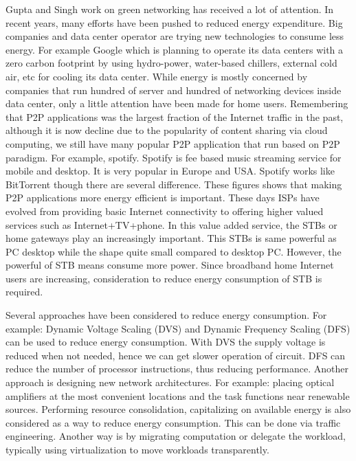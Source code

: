 Gupta and Singh \cite{Gupta:2003:GI:863955.863959} work on green networking has received a lot of attention.
In recent years, many efforts have been pushed to reduced energy expenditure.
Big companies and data center operator are trying new technologies to consume less energy.
For example Google which is planning to operate its data centers with a zero carbon footprint by using hydro-power, water-based chillers, external cold air, etc for cooling its data center.
While energy is mostly concerned by companies that run hundred of server and hundred of networking devices inside data center, only a little attention have been made for home users. 
Remembering that P2P applications was the largest fraction of the Internet traffic in the past, although it is now decline due to the popularity of content sharing via cloud computing, we still have many popular P2P application that run based on P2P paradigm.  
For example, spotify.
Spotify is fee based music streaming service for mobile and desktop. 
It is very popular in Europe and USA. 
Spotify works like BitTorrent though there are several difference.
These figures shows that making P2P applications more energy efficient is important.
These days ISPs have evolved from providing basic Internet connectivity to offering higher valued services such as Internet+TV+phone.
In this value added service, the STBs or home gateways play an increasingly important. 
This STBs is same powerful as PC desktop while the shape quite small compared to desktop PC. 
However, the powerful of STB means consume more power. 
Since broadband home Internet users are increasing, consideration to reduce energy consumption of STB is required. 

Several approaches have been considered to reduce energy consumption. 
For example: Dynamic Voltage Scaling (DVS) and Dynamic Frequency Scaling (DFS) can be used to reduce energy consumption.
With DVS the supply voltage is reduced when not needed, hence we can get slower operation of circuit.
DFS can reduce the number of processor instructions, thus reducing performance.
Another approach is designing new network architectures.
For example: placing optical amplifiers at the most convenient locations and the task functions near renewable sources.
Performing resource consolidation, capitalizing on available energy is also considered as a way to reduce energy consumption.
This can be done via traffic engineering. 
Another way is by migrating computation or delegate the workload, typically using virtualization to move workloads transparently.

